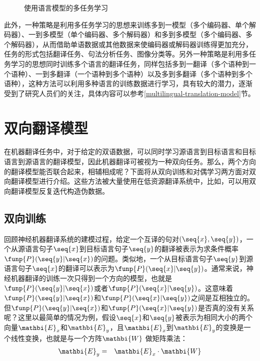 \begin{figure}[htp]
\centering

\caption{使用语言模型的多任务学习}
\label{fig:16-8}
\end{figure}

\parinterval 此外，一种策略是利用多任务学习的思想来训练多到一模型（多个编码器、单个解码器）、一到多模型（单个编码器、多个解码器）和多到多模型（多个编码器、多个解码器），从而借助单语数据或其他数据来使编码器或解码器训练得更加充分，任务的形式包括翻译任务、句法分析任务、图像分类等。另外一种策略是利用多任务学习的思想同时训练多个语言的翻译任务，同样包括多到一翻译（多个语种到一个语种）、一到多翻译（一个语种到多个语种）以及多到多翻译（多个语种到多个语种），这种方法可以利用多种语言的训练数据进行学习，具有较大的潜力，逐渐受到了研究人员们的关注，具体内容可以参考\ref{multilingual-translation-model}节。

\sectionnewpage
\section{双向翻译模型}

\parinterval 在机器翻译任务中，对于给定的双语数据，可以同时学习源语言到目标语言和目标语言到源语言的翻译模型，因此机器翻译可被视为一种双向任务。那么，两个方向的翻译模型能否联合起来，相辅相成呢？下面将从双向训练和对偶学习两方面对双向翻译模型进行介绍。这些方法被大量使用在低资源翻译系统中，比如，可以用双向翻译模型反复迭代构造伪数据。

\subsection{双向训练}

\parinterval 回顾神经机器翻译系统的建模过程，给定一个互译的句对$(\seq{x},\seq{y})$，一个从源语言句子$\seq{x}$到目标语言句子$\seq{y}$的翻译被表示为求条件概率$\funp{P}(\seq{y}|\seq{x})$的问题。类似地，一个从目标语言句子$\seq{y}$到源语言句子$\seq{x}$的翻译可以表示为$\funp{P}(\seq{x}|\seq{y})$。通常来说，神经机器翻译的训练一次只得到一个方向的模型，也就是$\funp{P}(\seq{y}|\seq{x})$或者$\funp{P}(\seq{x}|\seq{y})$。这意味着$\funp{P}(\seq{y}|\seq{x})$和$\funp{P}(\seq{x}|\seq{y})$之间是互相独立的。但$\funp{P}(\seq{y}|\seq{x})$和$\funp{P}(\seq{x}|\seq{y})$是否真的没有关系呢？这里以最简单的情况为例，假设$\seq{x}$和$\seq{y}$被表示为相同大小的两个向量$\mathbi{E}_x$和$\mathbi{E}_y$，且$\mathbi{E}_x$到$\mathbi{E}_y$的变换是一个线性变换，也就是与一个方阵$\mathbi{W}$ 做矩阵乘法：
\begin{eqnarray}
\mathbi{E}_y & = & \mathbi{E}_x \cdot \mathbi{W}
\label{eq:16-2}
\end{eqnarray}

